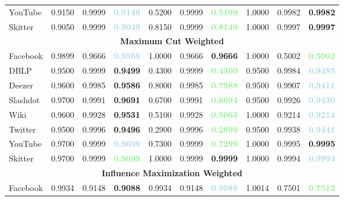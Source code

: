 \begin{table}[h]
\begin{tabular}{l|ccc|ccc|ccc}
YouTube & 0.9150 & 0.9999 & \textbf{\textcolor{lightblue}{0.9149}} & 0.5200 & 0.9999 & \textbf{\textcolor{lightgreen}{0.5199}} & 1.0000 & 0.9982 & \textbf{\textcolor{lightred}{0.9982}} \\
Skitter & 0.9050 & 0.9999 & \textbf{\textcolor{lightblue}{0.9049}} & 0.8150 & 0.9999 & \textbf{\textcolor{lightgreen}{0.8149}} & 1.0000 & 0.9997 & \textbf{\textcolor{lightred}{0.9997}} \\
\midrule
\multicolumn{10}{c}{\textbf{Maximum Cut Weighted}} \\
 \midrule
Facebook & 0.9899 & 0.9666 & \textbf{\textcolor{lightblue}{0.9568}} & 1.0000 & 0.9666 & \textbf{\textcolor{lightred}{0.9666}} & 1.0000 & 0.5002 & \textbf{\textcolor{lightgreen}{0.5002}} \\
DBLP & 0.9500 & 0.9999 & \textbf{\textcolor{lightred}{0.9499}} & 0.4300 & 0.9999 & \textbf{\textcolor{lightgreen}{0.4300}} & 0.9500 & 0.9984 & \textbf{\textcolor{lightblue}{0.9485}} \\
Deezer & 0.9600 & 0.9985 & \textbf{\textcolor{lightred}{0.9586}} & 0.8000 & 0.9985 & \textbf{\textcolor{lightgreen}{0.7988}} & 0.9500 & 0.9907 & \textbf{\textcolor{lightblue}{0.9411}} \\
Slashdot & 0.9700 & 0.9991 & \textbf{\textcolor{lightred}{0.9691}} & 0.6700 & 0.9991 & \textbf{\textcolor{lightgreen}{0.6694}} & 0.9500 & 0.9926 & \textbf{\textcolor{lightblue}{0.9430}} \\
Wiki & 0.9600 & 0.9928 & \textbf{\textcolor{lightred}{0.9531}} & 0.5100 & 0.9928 & \textbf{\textcolor{lightgreen}{0.5063}} & 1.0000 & 0.9214 & \textbf{\textcolor{lightblue}{0.9214}} \\
Twitter & 0.9500 & 0.9996 & \textbf{\textcolor{lightred}{0.9496}} & 0.2900 & 0.9996 & \textbf{\textcolor{lightgreen}{0.2899}} & 0.9500 & 0.9938 & \textbf{\textcolor{lightblue}{0.9441}} \\
YouTube & 0.9700 & 0.9999 & \textbf{\textcolor{lightblue}{0.9699}} & 0.7300 & 0.9999 & \textbf{\textcolor{lightgreen}{0.7299}} & 1.0000 & 0.9995 & \textbf{\textcolor{lightred}{0.9995}} \\
Skitter & 0.9700 & 0.9999 & \textbf{\textcolor{lightgreen}{0.9699}} & 1.0000 & 0.9999 & \textbf{\textcolor{lightred}{0.9999}} & 1.0000 & 0.9994 & \textbf{\textcolor{lightblue}{0.9994}} \\
\midrule
\multicolumn{10}{c}{\textbf{Influence Maximization Weighted}} \\
 \midrule
Facebook & 0.9934 & 0.9148 & \textbf{\textcolor{lightred}{0.9088}} & 0.9934 & 0.9148 & \textbf{\textcolor{lightblue}{0.9088}} & 1.0014 & 0.7501 & \textbf{\textcolor{lightgreen}{0.7512}} \\

\end{tabular}
\end{table}
